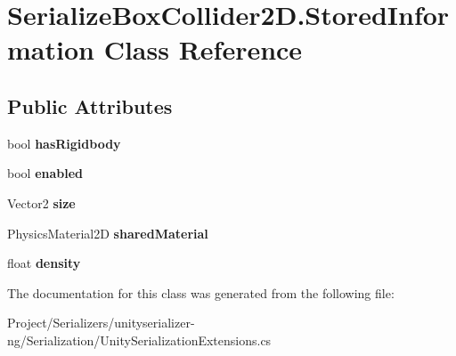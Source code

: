 \hypertarget{class_serialize_box_collider2_d_1_1_stored_information}{}\section{Serialize\+Box\+Collider2\+D.\+Stored\+Information Class Reference}
\label{class_serialize_box_collider2_d_1_1_stored_information}
\subsection*{Public Attributes}
\begin{DoxyCompactItemize}
\item 
\mbox{\label{class_serialize_box_collider2_d_1_1_stored_information_a80e4075825133b16d17ebf4619b59d4b}} 
bool {\bfseries has\+Rigidbody}
\item 
\mbox{\label{class_serialize_box_collider2_d_1_1_stored_information_a0f2561a0ffd44f371c7db9d0523634f6}} 
bool {\bfseries enabled}
\item 
\mbox{\label{class_serialize_box_collider2_d_1_1_stored_information_a463e3c144b1d0aaffc9e891628c41e87}} 
Vector2 {\bfseries size}
\item 
\mbox{\label{class_serialize_box_collider2_d_1_1_stored_information_a00065b4309a794e0b8dfd50e582dbf37}} 
Physics\+Material2D {\bfseries shared\+Material}
\item 
\mbox{\label{class_serialize_box_collider2_d_1_1_stored_information_a416e473bfb0812a5654d3b2b5cecf0b2}} 
float {\bfseries density}
\end{DoxyCompactItemize}


The documentation for this class was generated from the following file\+:\begin{DoxyCompactItemize}
\item 
Project/\+Serializers/unityserializer-\/ng/\+Serialization/Unity\+Serialization\+Extensions.\+cs\end{DoxyCompactItemize}
